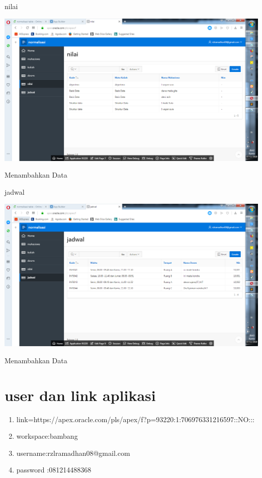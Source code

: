 \documentclass{article}
\begin{document}
\begin{enumerate}
    nilai
        \begin{center}
         \centering
            \includegraphics[scale=0.27]{gambar/30.png}
        \caption{Menambahkan Data}
        \label{excel}
    \end{center}
    
    jadwal
        \begin{center}
         \centering
            \includegraphics[scale=0.27]{gambar/31.png}
        \caption{Menambahkan Data}
        \label{excel}
    \end{center}

\end{enumerate}

\section{user dan link aplikasi}
\begin{enumerate}
\item link=https://apex.oracle.com/pls/apex/f?p=93220:1:706976331216597::NO:::
\item workspace:bambang
\item username:rzlramadhan08@gmail.com
\item password :081214488368
\end{enumerate}
\end{document}

